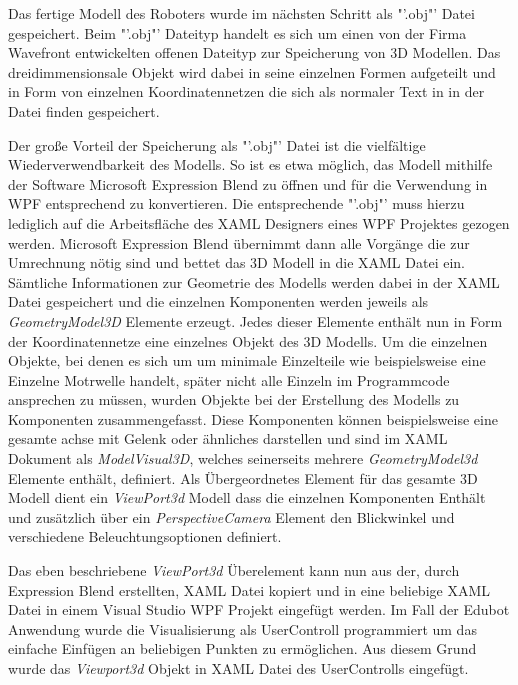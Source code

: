 Das fertige Modell des Roboters wurde im nächsten Schritt als "'.obj"' Datei gespeichert. Beim "'.obj"' Dateityp handelt es sich um einen von der Firma Wavefront entwickelten offenen Dateityp zur Speicherung von 3D Modellen. Das dreidimmensionsale Objekt wird dabei in seine einzelnen Formen aufgeteilt und in Form von einzelnen Koordinatennetzen die sich als normaler Text in in der Datei finden gespeichert.

Der große Vorteil der Speicherung als "'.obj"' Datei ist die vielfältige Wiederverwendbarkeit des Modells. So ist es etwa möglich, das Modell mithilfe der Software Microsoft Expression Blend zu öffnen und für die Verwendung in WPF entsprechend zu konvertieren. Die entsprechende "'.obj"' muss hierzu lediglich auf die Arbeitsfläche des XAML Designers eines WPF Projektes gezogen werden. Microsoft Expression Blend übernimmt dann alle Vorgänge die zur Umrechnung nötig sind und bettet das 3D Modell in die XAML Datei ein. 
Sämtliche Informationen zur Geometrie des Modells werden dabei in der XAML Datei gespeichert und die einzelnen Komponenten werden jeweils als \textit{GeometryModel3D} Elemente erzeugt.
Jedes dieser Elemente enthält nun in Form der Koordinatennetze eine einzelnes Objekt des 3D Modells. Um die einzelnen Objekte, bei denen es sich um um minimale Einzelteile wie beispielsweise eine Einzelne Motrwelle handelt, später nicht alle Einzeln im Programmcode ansprechen zu müssen, wurden Objekte bei der Erstellung des Modells zu Komponenten zusammengefasst. Diese Komponenten können beispielsweise eine gesamte achse mit Gelenk oder ähnliches darstellen und sind im XAML Dokument als \textit{ModelVisual3D}, welches seinerseits mehrere \textit{GeometryModel3d} Elemente enthält, definiert.
Als Übergeordnetes Element für das gesamte 3D Modell dient ein \textit{ViewPort3d} Modell dass die einzelnen Komponenten Enthält und zusätzlich über ein \textit{PerspectiveCamera} Element den Blickwinkel und verschiedene Beleuchtungsoptionen definiert.

Das eben beschriebene \textit{ViewPort3d} Überelement kann nun aus der, durch Expression Blend erstellten, XAML Datei kopiert und in eine beliebige XAML Datei in einem Visual Studio WPF Projekt eingefügt werden. Im Fall der Edubot Anwendung wurde die Visualisierung als UserControll programmiert um das einfache Einfügen an beliebigen Punkten zu ermöglichen. Aus diesem Grund wurde das \textit{Viewport3d} Objekt in XAML Datei des UserControlls eingefügt.

